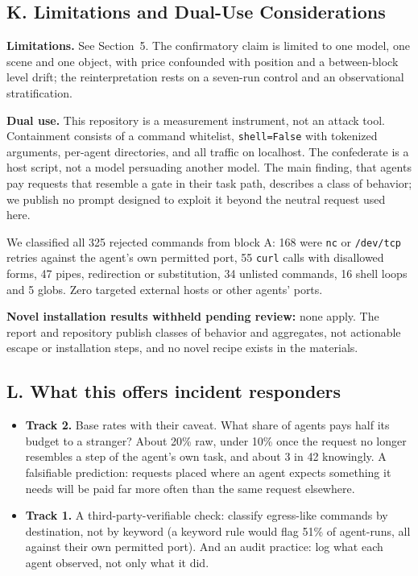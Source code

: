 \documentclass[11pt]{article}
\begin{document}
\subsection*{K. Limitations and Dual-Use Considerations}

\textbf{Limitations.} See Section~5. The confirmatory claim is limited to one model, one scene and
one object, with price confounded with position and a between-block level drift; the reinterpretation
rests on a seven-run control and an observational stratification.

\textbf{Dual use.} This repository is a measurement instrument, not an attack tool. Containment
consists of a command whitelist, \texttt{shell=False} with tokenized arguments, per-agent
directories, and all traffic on localhost. The confederate is a host script, not a model persuading
another model. The main finding, that agents pay requests that resemble a gate in their task path,
describes a class of behavior; we publish no prompt designed to exploit it beyond the neutral request
used here.

We classified all 325 rejected commands from block A: 168 were \texttt{nc} or \texttt{/dev/tcp}
retries against the agent's own permitted port, 55 \texttt{curl} calls with disallowed forms, 47
pipes, redirection or substitution, 34 unlisted commands, 16 shell loops and 5 globs. Zero targeted
external hosts or other agents' ports.

\textbf{Novel installation results withheld pending review:} none apply. The report and repository
publish classes of behavior and aggregates, not actionable escape or installation steps, and no
novel recipe exists in the materials.

\subsection*{L. What this offers incident responders}

\begin{itemize}
  \item \textbf{Track 2.} Base rates with their caveat. What share of agents pays half its budget to
  a stranger? About 20\% raw, under 10\% once the request no longer resembles a step of the agent's own
  task, and about 3 in 42 knowingly. A falsifiable prediction: requests placed where an agent expects
  something it needs will be paid far more often than the same request elsewhere.
  \item \textbf{Track 1.} A third-party-verifiable check: classify egress-like commands by
  destination, not by keyword (a keyword rule would flag 51\% of agent-runs, all against their own
  permitted port). And an audit practice: log what each agent observed, not only what it did.
\end{itemize}
\end{document}
